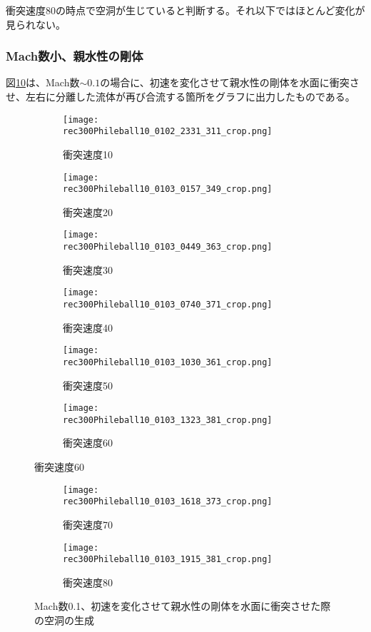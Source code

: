 \documentclass[]{jsarticle}
\begin{document}
衝突速度80の時点で空洞が生じていると判断する。それ以下ではほとんど変化が見られない。
\subsubsection{Mach数小、親水性の剛体}
\label{subsec:MSPhile}
図\ref{fig:MachSPhile}は、Mach数$\sim0.1$の場合に、初速を変化させて親水性の剛体を水面に衝突させ、左右に分離した流体が再び合流する箇所をグラフに出力したものである。
\begin{figure}[H]
  \centering
\begin{subfigure}{0.3\columnwidth}
  \centering
  \texttt{[image: rec300Phileball10\_0102\_2331\_311\_crop.png]}
  \caption{衝突速度10}
  \label{fig:MLPhilevel10}
\end{subfigure}
\begin{subfigure}{0.3\columnwidth}
  \centering
  \texttt{[image: rec300Phileball10\_0103\_0157\_349\_crop.png]}
  \caption{衝突速度20}
  \label{fig:MLPhilevel20}
\end{subfigure}
\begin{subfigure}{0.3\columnwidth}
  \centering
  \texttt{[image: rec300Phileball10\_0103\_0449\_363\_crop.png]}
  \caption{衝突速度30}
  \label{fig:MLPhilevel30}
\end{subfigure}
\begin{subfigure}{0.3\columnwidth}
  \centering
  \texttt{[image: rec300Phileball10\_0103\_0740\_371\_crop.png]}
  \caption{衝突速度40}
  \label{fig:MLPhilevel40}
\end{subfigure}
\begin{subfigure}{0.3\columnwidth}
  \centering
  \texttt{[image: rec300Phileball10\_0103\_1030\_361\_crop.png]}
  \caption{衝突速度50}
  \label{fig:MLPhilevel50}
\end{subfigure}
\begin{subfigure}{0.3\columnwidth}
  \centering
  \texttt{[image: rec300Phileball10\_0103\_1323\_381\_crop.png]}
  \caption{衝突速度60}
  \label{fig:MLPhilevel60}
\end{subfigure}
\end{figure}
\clearpage
\begin{figure}
\ContinuedFloat
  \begin{subfigure}{0.3\columnwidth}
  \centering
  \texttt{[image: rec300Phileball10\_0103\_1618\_373\_crop.png]}
  \caption{衝突速度70}
  \label{fig:MLPhilevel70}
\end{subfigure}
\begin{subfigure}{0.3\columnwidth}
  \centering
  \texttt{[image: rec300Phileball10\_0103\_1915\_381\_crop.png]}
  \caption{衝突速度80}
  \label{fig:MLPhilevel80}
\end{subfigure}
\caption{Mach数0.1、初速を変化させて親水性の剛体を水面に衝突させた際の空洞の生成}
\label{fig:MachSPhile}
\end{figure}
\end{document}

